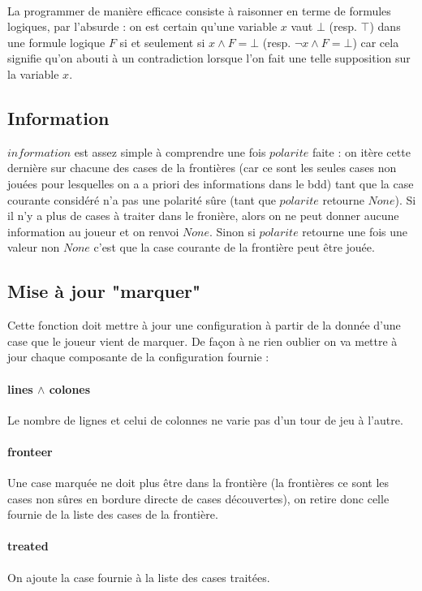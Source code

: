 \documentclass{report}
\begin{document}
	\paragraph{}
	La programmer de manière efficace consiste à raisonner en terme de formules logiques, par l'absurde : on est certain qu'une variable $x$ vaut $\bot$ (resp. $\top$) dans une formule logique $F$ si et seulement si $x \wedge F = \bot$ (resp. $\neg x \wedge F = \bot$) car cela signifie qu'on abouti à un contradiction lorsque l'on fait une telle supposition sur la variable $x$.
	 
	\subsection{Information}
	$information$ est assez simple à comprendre une fois $polarite$ faite : on itère cette dernière sur chacune des cases de la frontières (car ce sont les seules cases non jouées pour lesquelles on a a priori des informations dans le bdd) tant que la case courante considéré n'a pas une polarité s\^ure (tant que $polarite$ retourne $None$). Si il n'y a plus de cases à traiter dans le fronière, alors on ne peut donner aucune information au joueur et on renvoi $None$. Sinon si $polarite$ retourne une fois une valeur non $None$ c'est que la case courante de la frontière peut \^etre jouée.
	 
	\subsection{Mise à jour "marquer"}
	Cette fonction doit mettre à jour une configuration à partir de la donnée d'une case que le joueur vient de marquer. De façon à ne rien oublier on va mettre à jour chaque composante de la configuration fournie :
	\paragraph{lines $\wedge$ colones}
	Le nombre de lignes et celui de colonnes ne varie pas d'un tour de jeu à l'autre.
	\paragraph{fronteer}
	Une case marquée ne doit plus \^etre dans la frontière (la frontières ce sont les cases non s\^ures en bordure directe de cases découvertes), on retire donc celle fournie de la liste des cases de la frontière.
	\paragraph{treated}
	On ajoute la case fournie à la liste des cases traitées.
\end{document}

